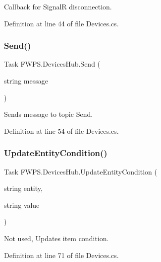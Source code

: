 Callback for SignalR disconnection. 



Definition at line 44 of file Devices.\+cs.

\mbox{\label{class_f_w_p_s_1_1_devices_hub_ae1ae1078929eaa4b46e653ce66e91d85}} 
\subsubsection{\texorpdfstring{Send()}{Send()}}
{\footnotesize\ttfamily Task F\+W\+P\+S.\+Devices\+Hub.\+Send (\begin{DoxyParamCaption}\item[{string}]{message }\end{DoxyParamCaption})}



Sends message to topic \textquotesingle{}Send\textquotesingle{}. 



Definition at line 54 of file Devices.\+cs.

\mbox{\label{class_f_w_p_s_1_1_devices_hub_a6d952a1d6529e35a7c4ab9260e576b5a}} 
\subsubsection{\texorpdfstring{Update\+Entity\+Condition()}{UpdateEntityCondition()}}
{\footnotesize\ttfamily Task F\+W\+P\+S.\+Devices\+Hub.\+Update\+Entity\+Condition (\begin{DoxyParamCaption}\item[{string}]{entity,  }\item[{string}]{value }\end{DoxyParamCaption})}



Not used, Updates item condition. 



Definition at line 71 of file Devices.\+cs.

\mbox{\label{class_f_w_p_s_1_1_devices_hub_a9ef83a80ed7ebcbaafc5fa4970c65875}} 
